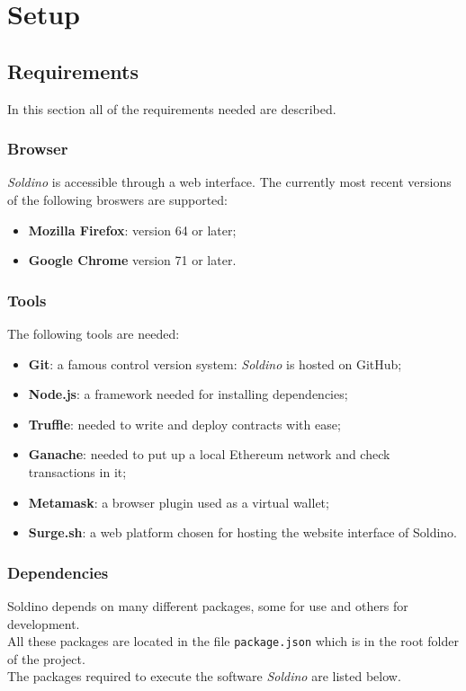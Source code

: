 \section{Setup} 
\subsection{Requirements}
In this section all of the requirements needed are described.
\subsubsection{Browser}
\textit{Soldino} is accessible through a web interface. The currently most recent versions of the following broswers are supported:
\begin{itemize}
	\item \textbf{Mozilla Firefox}: version 64 or later;
	\item \textbf{Google Chrome} version 71 or later.
\end{itemize}

\subsubsection{Tools}
The following tools are needed:
\begin{itemize}
	\item \textbf{Git}: a famous control version system: \textit{Soldino} is hosted on GitHub;
	\item \textbf{Node.js}: a framework needed for installing dependencies;
	\item \textbf{Truffle}: needed to write and deploy contracts with ease;
	\item \textbf{Ganache}: needed to put up a local Ethereum network and check transactions in it;
	\item \textbf{Metamask}: a browser plugin used as a virtual wallet;
	\item \textbf{Surge.sh}: a web platform chosen for hosting the website interface of Soldino.
\end{itemize}

\subsubsection{Dependencies}
Soldino depends on many different packages, some for use and others for development.\\
All these packages are located in the file \texttt{package.json} which is in the root folder of the project.\\
The packages required to execute the software \textit{Soldino} are listed below.\\

